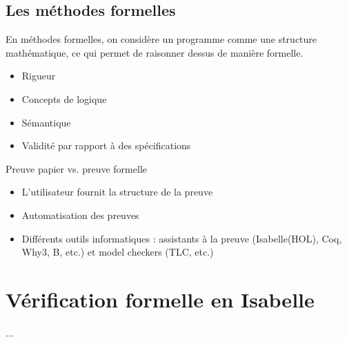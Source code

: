 \documentclass{beamer}
\theoremstyle{definition}
\begin{document}
\subsection{Les méthodes formelles}
\begin{frame}
    En méthodes formelles, on considère un programme comme une structure mathématique, ce qui permet de raisonner dessus de manière formelle.
    \vfill
    \begin{itemize}
        \item Rigueur
        \item Concepts de logique
        \item Sémantique
        \item Validité par rapport à des spécifications
    \end{itemize}
\end{frame}

\begin{frame}
    \begin{center}
        Preuve papier vs. preuve formelle
    \end{center}
    \begin{itemize}
        \item L'utilisateur fournit la structure de la preuve
        \item Automatisation des preuves
        \item Différents outils informatiques : assistants à la preuve (Isabelle(HOL), Coq, Why3, B, etc.) et model checkers (TLC, etc.)
    \end{itemize}
\end{frame}

\section{Vérification formelle en Isabelle}
\begin{frame}
    ...
\end{frame}
\end{document}
